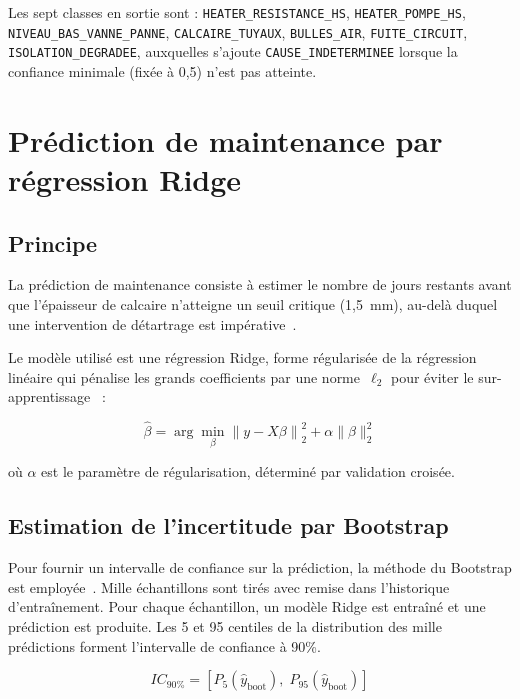 Les sept classes en sortie sont : \texttt{HEATER\_RESISTANCE\_HS}, \texttt{HEATER\_POMPE\_HS}, \texttt{NIVEAU\_BAS\_VANNE\_PANNE}, \texttt{CALCAIRE\_TUYAUX}, \texttt{BULLES\_AIR}, \texttt{FUITE\_CIRCUIT}, \texttt{ISOLATION\_DEGRADEE}, auxquelles s'ajoute \texttt{CAUSE\_INDETERMINEE} lorsque la confiance minimale (fixée à 0,5) n'est pas atteinte.

\section{Prédiction de maintenance par régression Ridge}

\subsection{Principe}

La prédiction de maintenance consiste à estimer le nombre de jours restants avant que l'épaisseur de calcaire n'atteigne un seuil critique (1,5~mm), au-delà duquel une intervention de détartrage est impérative~\cite{bib26}.

Le modèle utilisé est une régression Ridge, forme régularisée de la régression linéaire qui pénalise les grands coefficients par une norme~\(\ell_2\) pour éviter le sur-apprentissage~\cite{bib33} :

\begin{equation}
\hat{\beta} = \arg\min_{\beta} \left\| y - X\beta \right\|_2^2 + \alpha \|\beta\|_2^2
\label{eq:ridge}
\end{equation}

où \(\alpha\) est le paramètre de régularisation, déterminé par validation croisée.

\subsection{Estimation de l'incertitude par Bootstrap}

Pour fournir un intervalle de confiance sur la prédiction, la méthode du Bootstrap est employée~\cite{bib34}. Mille échantillons sont tirés avec remise dans l'historique d'entraînement. Pour chaque échantillon, un modèle Ridge est entraîné et une prédiction est produite. Les 5 et 95 centiles de la distribution des mille prédictions forment l'intervalle de confiance à 90\%.

\begin{equation}
IC_{90\%} = \left[ P_5(\hat{y}_{\text{boot}}),\; P_{95}(\hat{y}_{\text{boot}}) \right]
\label{eq:bootstrap}
\end{equation}


